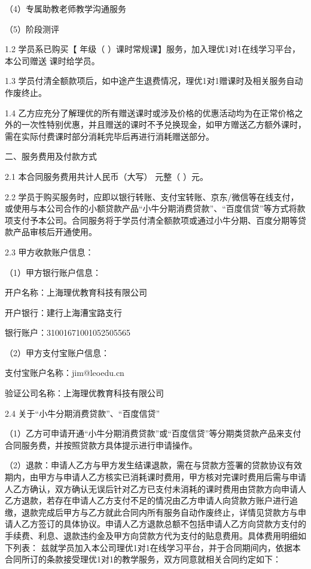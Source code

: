\documentclass {ctexart}
\begin{document}
（4）专属助教老师教学沟通服务

（5）阶段测评

1.2	学员系已购买【        年级（  ）课时常规课】服务，加入理优1对1在线学习平台，本公司赠送     课时给学员。

1.3	学员付清全额款项后，如中途产生退费情况，理优1对1赠课时及相关服务自动作废终止。

1.4	乙方应充分了解理优的所有赠送课时或涉及价格的优惠活动均为在正常价格之外的一次性特别优惠，并且赠送的课时不予兑换现金，如甲方赠送乙方额外课时，需在实际付费课时部分消耗完毕后再进行消耗赠送部分。


二、服务费用及付款方式

2.1	本合同服务费用共计人民币（大写）         元整（     ）元。

2.2	学员于购买服务时，应即以银行转账、支付宝转账、京东/微信等在线支付，或使用与本公司合作的小额贷款产品“小牛分期消费贷款”、“百度信贷”等方式将款项支付予本公司。合同服务将于学员付清全额款项或通过小牛分期、百度分期等贷款产品审核后开通使用。

2.3	甲方收款账户信息：

（1）甲方银行账户信息：

开户名称：上海理优教育科技有限公司

开户银行：建行上海漕宝路支行

银行账户：31001671001052505565

（2）甲方支付宝账户信息：

支付宝账户名称：jim@leoedu.cn

验证公司名称：上海理优教育科技有限公司

2.4	关于“小牛分期消费贷款”、“百度信贷”

（1）乙方可申请开通“小牛分期消费贷款”或“百度信贷”等分期类贷款产品来支付合同服务费，并按照贷款方具体提示进行申请操作。

（2）退款：申请人乙方与甲方发生结课退款，需在与贷款方签署的贷款协议有效期内，由甲方与申请人乙方核实已消耗课时费用，甲方核对完课时费用后需与申请人乙方确认，双方确认无误后针对乙方已支付未消耗的课时费用由贷款方向申请人乙方退款，若存在申请人乙方支付不足的情况由乙方申请人向贷款方账户进行追缴，退款完成后甲方与乙方就此合同内所有服务自动作废终止，详情见贷款方与申请人乙方签订的具体协议。申请人乙方退款总额不包括申请人乙方向贷款方支付的手续费、利息、退款违约金及甲方向贷款方代为支付的贴息费用。具体费用明细如下列表：
兹就学员加入本公司理优1对1在线学习平台，并于合同期间内，依据本合同所订的条款接受理优1对1的教学服务，双方同意就相关合同约定如下：
\end{document}
